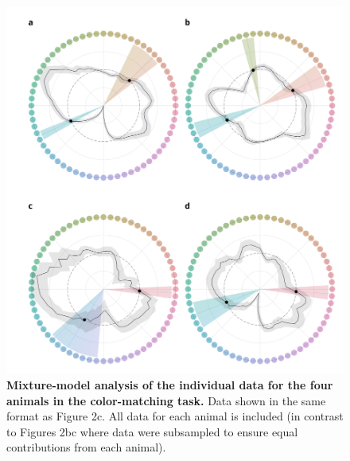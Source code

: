 \documentclass[9pt,biorxiv,lineno,onehalfspacing]{lapreprint}
\begin{document}
\begin{figure}
    \centering
    \begin{fullwidth}
    \includegraphics[width=\textwidth+4cm]{Outputs/Paper/Figures/flat/SI4_MM.jpg}
    \caption{\textbf{Mixture-model analysis of the individual data for the four animals in the color-matching task.}
    Data shown in the same format as Figure 2c.
    All data for each animal is included (in contrast to Figures 2bc where data were subsampled to ensure equal contributions from each animal).
    } 
    \label{fig:IndiMM}
    \end{fullwidth}
\end{figure}
\end{document}
